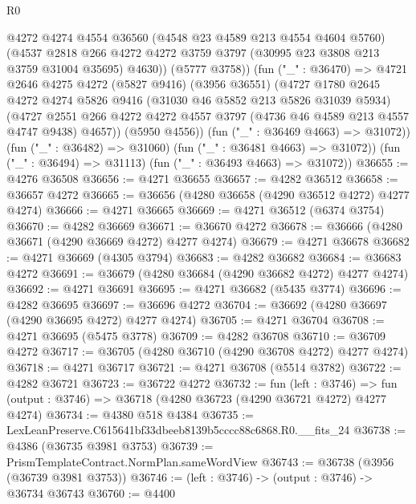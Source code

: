 \begin{lexlean}{R0}
\begin{coremodule}
              @4272
              @4274
              @4554
              @36560
              (@4548 @23 @4589 @213 @4554 @4604 @5760)
              (@4537
                @2818
                @266
                @4272
                @4272
                @3759
                @3797
                (@30995 @23 @3808 @213 @3759 @31004 @35695)
                @4630))
            (@5777 @3758))
          (fun ("_" : @36470) =>
          @4721
            @2646
            @4275
            @4272
            (@5827 @9416)
            (@3956 @36551)
            (@4727
              @1780
              @2645
              @4272
              @4274
              @5826
              @9416
              (@31030 @46 @5852 @213 @5826 @31039 @5934)
              (@4727
                @2551
                @266
                @4272
                @4272
                @4557
                @3797
                (@4736 @46 @4589 @213 @4557 @4747 @9438)
                @4657))
            (@5950 @4556))
          (fun ("_" : @36469 @4663) => @31072))
        (fun ("_" : @36482) => @31060)
        (fun ("_" : @36481 @4663) => @31072))
      (fun ("_" : @36494) => @31113)
      (fun ("_" : @36493 @4663) => @31072))
@36655 := @4276 @36508
@36656 := @4271 @36655
@36657 := @4282 @36512
@36658 := @36657 @4272
@36665 := @36656 (@4280 @36658 (@4290 @36512 @4272) @4277 @4274)
@36666 := @4271 @36665
@36669 := @4271 @36512 (@6374 @3754)
@36670 := @4282 @36669
@36671 := @36670 @4272
@36678 := @36666 (@4280 @36671 (@4290 @36669 @4272) @4277 @4274)
@36679 := @4271 @36678
@36682 := @4271 @36669 (@4305 @3794)
@36683 := @4282 @36682
@36684 := @36683 @4272
@36691 := @36679 (@4280 @36684 (@4290 @36682 @4272) @4277 @4274)
@36692 := @4271 @36691
@36695 := @4271 @36682 (@5435 @3774)
@36696 := @4282 @36695
@36697 := @36696 @4272
@36704 := @36692 (@4280 @36697 (@4290 @36695 @4272) @4277 @4274)
@36705 := @4271 @36704
@36708 := @4271 @36695 (@5475 @3778)
@36709 := @4282 @36708
@36710 := @36709 @4272
@36717 := @36705 (@4280 @36710 (@4290 @36708 @4272) @4277 @4274)
@36718 := @4271 @36717
@36721 := @4271 @36708 (@5514 @3782)
@36722 := @4282 @36721
@36723 := @36722 @4272
@36732 := fun (left : @3746) =>
  fun (output : @3746) => @36718 (@4280 @36723 (@4290 @36721 @4272) @4277 @4274)
@36734 := @4380 @518 @4384
@36735 := LexLeanPreserve.C615641bf33dbeeb8139b5cccc88c6868.R0.__fits_24
@36738 := @4386 (@36735 @3981 @3753)
@36739 := PrismTemplateContract.NormPlan.sameWordView
@36743 := @36738 (@3956 (@36739 @3981 @3753))
@36746 := (left : @3746) -> (output : @3746) -> @36734 @36743
@36760 := @4400

\end{coremodule}
\end{lexlean}
